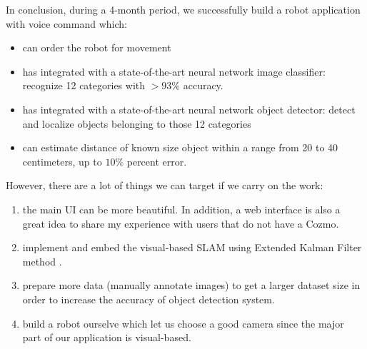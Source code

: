 In conclusion, during a 4-month period, we successfully build a robot application with voice command which:
\begin{itemize}
	\item can order the robot for movement
	\item has integrated with a state-of-the-art neural network image classifier: recognize 12 categories with $> 93\%$ accuracy.
	\item has integrated with a state-of-the-art neural network object detector: detect and localize objects belonging to those 12 categories
	\item can estimate distance of known size object within a range from 20 to 40 centimeters, up to $10\%$ percent error.
\end{itemize}
However, there are a lot of things we can target if we carry on the work:
\begin{enumerate}
	\item the main UI can be more beautiful. In addition, a web interface is also a great idea to share my experience with users that do not have a Cozmo.
	\item implement and embed the visual-based SLAM \cite{wiki:SLAM} using Extended Kalman Filter method \cite{wiki:Kalman}. 
	\item prepare more data (manually annotate images) to get a larger dataset size in order to increase the accuracy of object detection system.
	\item build a robot ourselve which let us choose a good camera since the major part of our application is visual-based.
\end{enumerate}